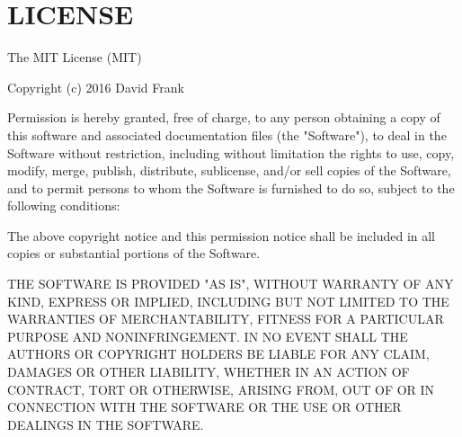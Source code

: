 \chapter{LICENSE}
\hypertarget{md_node__modules_2node-fetch_2_l_i_c_e_n_s_e}{}\label{md_node__modules_2node-fetch_2_l_i_c_e_n_s_e}
The MIT License (MIT)

Copyright (c) 2016 David Frank

Permission is hereby granted, free of charge, to any person obtaining a copy of this software and associated documentation files (the "{}\+Software"{}), to deal in the Software without restriction, including without limitation the rights to use, copy, modify, merge, publish, distribute, sublicense, and/or sell copies of the Software, and to permit persons to whom the Software is furnished to do so, subject to the following conditions\+:

The above copyright notice and this permission notice shall be included in all copies or substantial portions of the Software.

THE SOFTWARE IS PROVIDED "{}\+AS IS"{}, WITHOUT WARRANTY OF ANY KIND, EXPRESS OR IMPLIED, INCLUDING BUT NOT LIMITED TO THE WARRANTIES OF MERCHANTABILITY, FITNESS FOR A PARTICULAR PURPOSE AND NONINFRINGEMENT. IN NO EVENT SHALL THE AUTHORS OR COPYRIGHT HOLDERS BE LIABLE FOR ANY CLAIM, DAMAGES OR OTHER LIABILITY, WHETHER IN AN ACTION OF CONTRACT, TORT OR OTHERWISE, ARISING FROM, OUT OF OR IN CONNECTION WITH THE SOFTWARE OR THE USE OR OTHER DEALINGS IN THE SOFTWARE. 